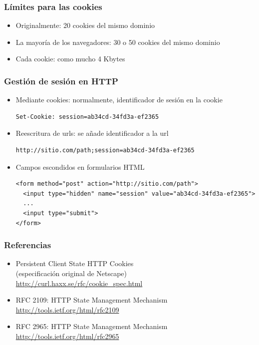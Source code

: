 \begin{frame}
\frametitle{Límites para las cookies}

\begin{itemize}
\item Originalmente: 20 cookies del mismo dominio
\item La mayoría de los navegadores: 30 o 50 cookies del mismo dominio
\item Cada cookie: como mucho 4 Kbytes
\end{itemize}


\end{frame}

\begin{frame}[fragile]
\frametitle{Gestión de sesión en HTTP}

\begin{itemize}
\item Mediante cookies: normalmente, identificador de sesión en la cookie

\begin{verbatim}
Set-Cookie: session=ab34cd-34fd3a-ef2365
\end{verbatim}

\item Reescritura de urls: se añade identificador a la url

\begin{verbatim}
http://sitio.com/path;session=ab34cd-34fd3a-ef2365
\end{verbatim}

\item Campos escondidos en formularios HTML

\begin{verbatim}
<form method="post" action="http://sitio.com/path">
  <input type="hidden" name="session" value="ab34cd-34fd3a-ef2365">
  ...
  <input type="submit">
</form>
\end{verbatim}

\end{itemize}

\end{frame}


\begin{frame}
\frametitle{Referencias}

\begin{itemize}
\item Persistent Client State HTTP Cookies \\
  (especificación original de Netscape) \\
  \url{http://curl.haxx.se/rfc/cookie_spec.html}
\item RFC 2109: HTTP State Management Mechanism \\
  \url{http://tools.ietf.org/html/rfc2109}

\item RFC 2965: HTTP State Management Mechanism \\
  \url{http://tools.ietf.org/html/rfc2965}
\end{itemize}
\end{frame}
